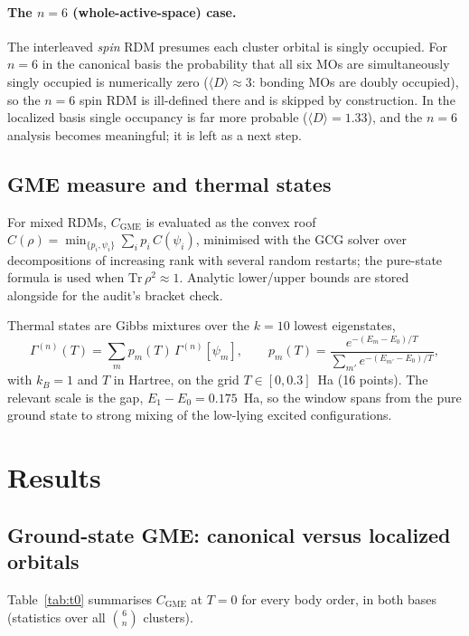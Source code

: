 \documentclass[11pt]{article}
\newcommand{\CGME}{\ensuremath{C_{\mathrm{GME}}}}
\newcommand{\rdm}{\ensuremath{\Gamma^{(n)}}}
\begin{document}
\paragraph{The $n=6$ (whole-active-space) case.}
The interleaved \emph{spin} RDM presumes each cluster orbital is singly
occupied. For $n=6$ in the canonical basis the probability that all six MOs are
simultaneously singly occupied is numerically zero
($\langle D\rangle\!\approx\!3$: bonding MOs are doubly occupied), so the
$n{=}6$ spin RDM is ill-defined there and is skipped by construction. In the
localized basis single occupancy is far more probable
($\langle D\rangle=1.33$), and the $n=6$ analysis becomes meaningful; it is
left as a next step.

\subsection{GME measure and thermal states}
For mixed RDMs, \CGME{} is evaluated as the convex roof
$C(\rho)=\min_{\{p_i,\psi_i\}}\sum_i p_i\,C(\psi_i)$, minimised with the GCG
solver over decompositions of increasing rank with several random restarts; the
pure-state formula is used when $\mathrm{Tr}\,\rho^2\approx1$. Analytic
lower/upper bounds are stored alongside for the audit's bracket check.

Thermal states are Gibbs mixtures over the $k=10$ lowest eigenstates,
\[
  \rdm(T)=\sum_{m} p_m(T)\,\rdm[\psi_m],\qquad
  p_m(T)=\frac{e^{-(E_m-E_0)/T}}{\sum_{m'}e^{-(E_{m'}-E_0)/T}},
\]
with $k_B=1$ and $T$ in Hartree, on the grid $T\in[0,0.3]$~Ha (16 points). The
relevant scale is the gap, $E_1-E_0=0.175$~Ha, so the window spans from the
pure ground state to strong mixing of the low-lying excited configurations.

\section{Results}\label{sec:results}

\subsection{Ground-state GME: canonical versus localized orbitals}
Table~\ref{tab:t0} summarises \CGME{} at $T=0$ for every body order, in both
bases (statistics over all $\binom{6}{n}$ clusters).
\end{document}
